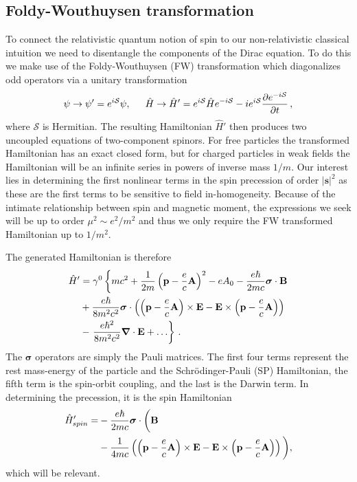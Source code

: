 \subsection{Foldy-Wouthuysen transformation}
To connect the relativistic quantum notion of spin to our non-relativistic classical intuition we need to disentangle the components of the Dirac equation. To do this we make use of the Foldy-Wouthuysen (FW) transformation which diagonalizes odd operators via a unitary transformation
\begin{alignat}{1}
  \label{FW01} \psi\rightarrow\psi'=e^{i\mathcal{S}}\psi,\indent\hat{H}\rightarrow\hat{H}'=e^{i\mathcal{S}}\hat{H}e^{-i\mathcal{S}}-ie^{i\mathcal{S}}\frac{\partial e^{-i\mathcal{S}}}{\partial t}\,,
\end{alignat}
where $\mathcal{S}$ is Hermitian. The resulting Hamiltonian $\hat{H}'$ then produces two uncoupled equations of two-component spinors. For free particles the transformed Hamiltonian has an exact closed form, but for charged particles in weak fields the Hamiltonian will be an infinite series in powers of inverse mass $1/m$. Our interest lies in determining the first nonlinear terms in the spin precession of order $|\mathbf{s}|^{2}$ as these are the first terms to be sensitive to field in-homogeneity. Because of the intimate relationship between spin and magnetic moment, the expressions we seek will be up to order $\mu^{2}\sim e^{2}/m^{2}$ and thus we only require the FW transformed Hamiltonian up to $1/m^{2}$.

The generated Hamiltonian is therefore
\begin{alignat}{1}
  \notag\hat{H}'&=\gamma^{0}\left\{mc^{2}+\frac{1}{2m}\left(\mathbf{p}-\frac{e}{c}\mathbf{A}\right)^{2}-eA_{0}-\frac{e\hbar}{2mc}\boldsymbol{\sigma}\cdot\mathbf{B}\right.\\
  \notag&+\frac{e\hbar}{8m^{2}c^{2}}\boldsymbol{\sigma}\cdot\left(\left(\mathbf{p}-\frac{e}{c}\mathbf{A}\right)\times\mathbf{E}-\mathbf{E}\times\left(\mathbf{p}-\frac{e}{c}\mathbf{A}\right)\right)\\
  \label{FW02}&-\left.\frac{e\hbar^{2}}{8m^{2}c^{2}}\boldsymbol{\nabla}\cdot\mathbf{E}+\ldots\right\}\,.
\end{alignat}
The $\boldsymbol{\sigma}$ operators are simply the Pauli matrices. The first four terms represent the rest mass-energy of the particle and the Schr\"{o}dinger-Pauli (SP) Hamiltonian, the fifth term is the spin-orbit coupling, and the last is the Darwin term. In determining the precession, it is the spin Hamiltonian
\begin{alignat}{1}
  \notag\hat{H}'_{spin}=&-\frac{e\hbar}{2mc}\boldsymbol{\sigma}\cdot\bigg(\mathbf{B}\\
  \label{FW03}&-\frac{1}{4mc}\left(\left(\mathbf{p}-\frac{e}{c}\mathbf{A}\right)\times\mathbf{E}-\mathbf{E}\times\left(\mathbf{p}-\frac{e}{c}\mathbf{A}\right)\right)\bigg),
\end{alignat}
which will be relevant.

